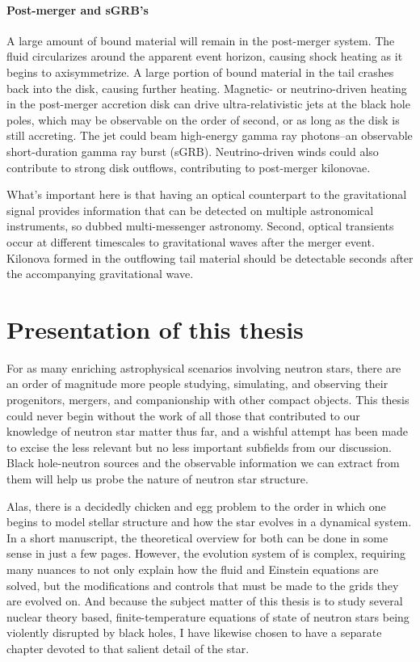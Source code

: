 \paragraph{Post-merger and sGRB's}
A large amount of bound material will remain in the post-merger system.  
The fluid circularizes around the apparent event horizon, causing shock heating as it begins to axisymmetrize. 
A large portion of bound material in the tail crashes back into the disk, causing further heating.
Magnetic- or neutrino-driven heating in the post-merger accretion disk can drive ultra-relativistic jets at the black hole poles, which may be observable on the order of second, or as long as the disk is still accreting.
The jet could beam high-energy gamma ray photons--an observable short-duration gamma ray burst (sGRB).
Neutrino-driven winds could also contribute to strong disk outflows, contributing to post-merger kilonovae.

What's important here is that having an optical counterpart to the gravitational signal provides information that can be detected on multiple astronomical instruments, so dubbed multi-messenger astronomy.
Second, optical transients occur at different timescales to gravitational waves after the merger event.
Kilonova formed in the outflowing tail material should be detectable seconds after the accompanying gravitational wave.  


\section{Presentation of this thesis}

For as many enriching astrophysical scenarios involving neutron stars, there are an order of magnitude more people studying, simulating, and observing their progenitors, mergers, and companionship with other compact objects.
This thesis could never begin without the work of all those that contributed to our knowledge of neutron star matter thus far, and a wishful attempt has been made to excise the less relevant but no less important subfields from our discussion.
Black hole-neutron sources and the observable information we can extract from them will help us probe the nature of neutron star structure.

Alas, there is a decidedly chicken and egg problem to the order in which one begins to model stellar structure and how the star evolves in a dynamical system.
In a short manuscript, the theoretical overview for both can be done in some sense in just a few pages. 
However, the evolution system of \SpEC is complex, requiring many nuances to not only explain how the fluid and Einstein equations are solved, but the modifications and controls that must be made to the grids they are evolved on.
And because the subject matter of this thesis is to study several nuclear theory based, finite-temperature equations of state of neutron stars being violently disrupted by black holes, I have likewise chosen to have a separate chapter devoted to that salient detail of the star.

